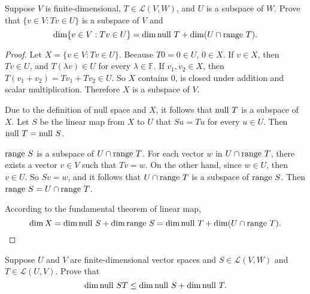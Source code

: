 \begin{exercise}
    Suppose $V$ is finite-dimensional, $T \in \mathcal{L}(V, W)$, and $U$ is a subspace of $W$. Prove that $\{v \in V : Tv \in U\}$ is a subspace of $V$ and
    \[
        \dim\{ v\in V : Tv\in U \} = \dim \operatorname{null}\,{T} + \dim (U\cap \operatorname{range}\,{T}).
    \]
\end{exercise}

\begin{proof}
    Let $X = \{v \in V : Tv \in U\}$. Because $T0 = 0\in U$, $0\in X$. If $v\in X$, then $Tv\in U$, and $T(\lambda v)\in U$ for every $\lambda\in\mathbb{F}$. If $v_{1}, v_{2}\in X$, then $T(v_{1} + v_{2}) = Tv_{1} + Tv_{2}\in U$. So $X$ contains $0$, is closed under addition and scalar multiplication. Therefore $X$ is a subspace of $V$.

    Due to the definition of null space and $X$, it follows that $\operatorname{null}\,{T}$ is a subspace of $X$. Let $S$ be the linear map from $X$ to $U$ that $Su = Tu$ for every $u\in U$. Then $\operatorname{null}\,{T} = \operatorname{null}\,{S}$.

    $\operatorname{range}\,{S}$ is a subspace of $U\cap \operatorname{range}\,{T}$. For each vector $w$ in $U\cap \operatorname{range}\,{T}$, there exists a vector $v\in V$ such that $Tv = w$. On the other hand, since $w\in U$, then $v\in U$. So $Sv = w$, and it follows that $U\cap \operatorname{range}\,{T}$ is a subspace of $\operatorname{range}\,{S}$. Then $\operatorname{range}\,{S} = U\cap \operatorname{range}\,{T}$.

    According to the fundamental theorem of linear map,
    \[
        \dim X = \dim\operatorname{null}\,{S} + \dim\operatorname{range}\,{S} = \dim\operatorname{null}\,{T} + \dim (U\cap\operatorname{range}\,{T}).\qedhere
    \]
\end{proof}
\newpage

\begin{exercise}
    Suppose $U$ and $V$ are finite-dimensional vector spaces and $S \in \mathcal{L}(V, W)$ and $T \in \mathcal{L}(U, V)$. Prove that
    \[
        \dim\operatorname{null}\,{ST} \leq \dim\operatorname{null}\,{S} + \dim\operatorname{null}\,{T}.
    \]
\end{exercise}

